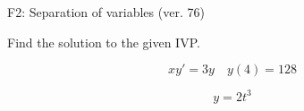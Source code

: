 \begin{exercise}
  \begin{exerciseTitle}F2: Separation of variables (ver. 76)\end{exerciseTitle}
  \begin{exerciseStatement}
    
Find the solution to the given IVP.

    
\[xy'= 3 y \hspace{1em} y( 4 ) = 128\]

  \end{exerciseStatement}
  \begin{exerciseAnswer}
    
\[y= 2 t^ 3\]

  \end{exerciseAnswer}
\end{exercise}